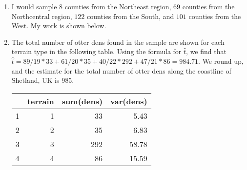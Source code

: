 \documentclass[12pt]{article}\usepackage[]{graphicx}\usepackage[]{color}
\makeatletter
\newcommand{\hlnum}[1]{\textcolor[rgb]{0.686,0.059,0.569}{#1}}%
\newcommand{\hlcom}[1]{\textcolor[rgb]{0.678,0.584,0.686}{\textit{#1}}}%
\newcommand{\hlopt}[1]{\textcolor[rgb]{0,0,0}{#1}}%
\newcommand{\hlstd}[1]{\textcolor[rgb]{0.345,0.345,0.345}{#1}}%
\newcommand{\hlkwd}[1]{\textcolor[rgb]{0.737,0.353,0.396}{\textbf{#1}}}%
\newenvironment{kframe}{%
 \def\at@end@of@kframe{}%
 \ifinner\ifhmode%
  \def\at@end@of@kframe{\end{minipage}}%
  \begin{minipage}{\columnwidth}%
 \fi\fi%
 \def\FrameCommand##1{\hskip\@totalleftmargin \hskip-\fboxsep
 \colorbox{shadecolor}{##1}\hskip-\fboxsep
     \hskip-\linewidth \hskip-\@totalleftmargin \hskip\columnwidth}%
 \MakeFramed {\advance\hsize-\width
   \@totalleftmargin\z@ \linewidth\hsize
   \@setminipage}}%
 {\par\unskip\endMakeFramed%
 \at@end@of@kframe}
\newenvironment{knitrout}{}{} %
\makeatother
\begin{document}
\begin{doublespacing}
\begin{enumerate}
\item I would sample $8$ counties from the Northeast region, $69$ counties from  the Northcentral region, $122$ counties from the South, and $101$ counties from the West. My work is shown below.


\item The total number of otter dens found in the sample are shown for each terrain type in the following table. Using the formula for $\hat{t}$, we find that $\hat{t} = 89/19*33+61/20*35+40/22*292+47/21*86 = 984.71$. We round up, and the estimate for the total number of otter dens along the coastline of Shetland, UK is $985$. 

\begin{table}[ht]
\centering
\begin{tabular}{rrrr}
  \hline
 & terrain & sum(dens) & var(dens) \\ 
  \hline
1 &   1 &  33 & 5.43 \\ 
  2 &   2 &  35 & 6.83 \\ 
  3 &   3 & 292 & 58.78 \\ 
  4 &   4 &  86 & 15.59 \\ 
   \hline
\end{tabular}
\end{table}



\end{enumerate}
\end{doublespacing}
\end{document}
